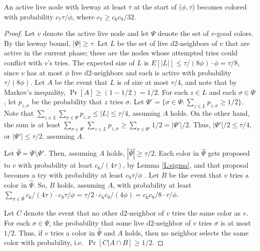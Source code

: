 \begin{lemma}
An active live node with leeway at least $\tau$ at the start of ($\phi,\tau$) becomes colored with probability $c_7 \tau/\phi$, where $c_7 \ge c_6c_9/32$.
\label{L:progress}
\end{lemma}
\begin{proof}
Let $v$ denote the active live node and let $\Psi$ denote the set of $v$-good colors. By the leeway bound, $|\Psi| \ge \tau$. 
Let $L$ be the set of live d2-neighbors of $v$ that are active in the current phase; these are the nodes whose attempted tries could conflict with $v$'s tries. 
The expected size of $L$ is $E[|L|] \le \tau/(8\phi) \cdot \phi = \tau/8$, since $v$ has at most $\phi$ live d2-neighbors and each is active with probability $\tau/(8\phi)$.
 Let $A$ be the event that $L$ is of size at most $\tau/4$, and note that by Markov's inequality, $\Pr[A] \ge (1-1/2) = 1/2$.
For each $z \in L$ and each $\sigma \in \Psi$, let $p_{z,\sigma}$ be the probability that $z$ tries $\sigma$.
Let $\Psi' = \{\sigma \in \Psi : \sum_{z \in L} p_{z,\sigma} \ge 1/2\}$. 
Note that $\sum_{z \in L} \sum_{\sigma \in \Psi} p_{z,\sigma} \le |L| \le \tau/4$, assuming $A$ holds. On the other hand, the sum is at least $\sum_{\sigma \in \Psi'} \sum_{z \in L} p_{z,\sigma} \ge \sum_{\sigma \in \Psi'} 1/2 = |\Psi'|/2$. Thus, $|\Psi'|/2 \le \tau/4$, or $|\Psi'| \le \tau/2$, assuming $A$.

Let $\hat{\Psi} = \Psi \setminus \Psi'$.
Then, assuming $A$ holds, $|\hat{\Psi}| \ge \tau/2$.
Each color in $\hat{\Psi}$ gets proposed to $v$ with probability at least $c_6/(4\tau)$, by Lemma \ref{L:sigma}, and that proposal becomes a try with probability at least $c_9 \tau/\phi$ .  Let $B$ be the event that $v$ tries a color in $\hat{\Psi}$. So, $B$ holds, assuming $A$, with probability at least 
$\sum_{\sigma \in \hat{\Psi}} c_6/(4\tau) \cdot c_9\tau/\phi = \tau/2 \cdot c_6c_9/(4\phi) = c_6c_9/8 \cdot \tau/\phi$.

Let $C$ denote the event that no other d2-neighbor of $v$ tries the same color as $v$. For each $\sigma \in \hat{\Psi}$, the probability that some live d2-neighbor of $v$ tries $\sigma$ is at most $1/2$. Thus, if $v$ tries a color in $\hat{\Psi}$ and $A$ holds, then no neighbor selects the same color with probability, i.e.\ $\Pr[C|A \cap B] \ge 1/2$. 


\end{proof}
